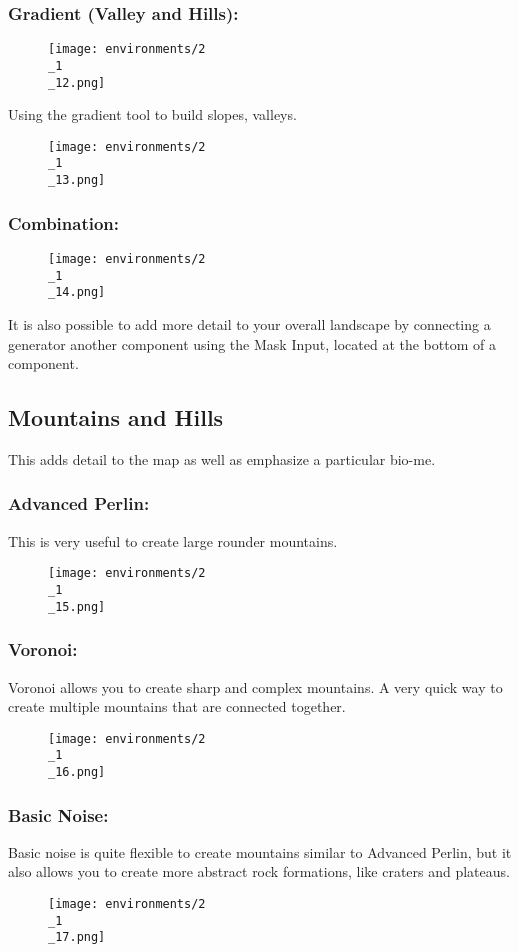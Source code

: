 \documentclass[../main.tex]{subfiles}
\begin{document}
\subsubsection{Gradient (Valley and Hills):}
\begin{figure}[H]
\texttt{[image: environments/2\\\_1\\\_12.png]}
\end{figure}
Using the gradient tool to build slopes, valleys.
\begin{figure}[H]
\texttt{[image: environments/2\\\_1\\\_13.png]}
\end{figure}
\subsubsection{Combination:}
\begin{figure}[H]
\texttt{[image: environments/2\\\_1\\\_14.png]}
\end{figure}
It is also possible to add more detail to your overall landscape by connecting a generator another component using the Mask Input, located at the bottom of a component.

\subsection{Mountains and Hills}
This adds detail to the map as well as emphasize a particular bio-me.
\subsubsection{Advanced Perlin:}
This is very useful to create large rounder mountains.
\begin{figure}[H]
\texttt{[image: environments/2\\\_1\\\_15.png]}
\end{figure}
\subsubsection{Voronoi:}
Voronoi allows you to create sharp and complex mountains. A very quick way to create multiple mountains that are connected together.
\begin{figure}[H]
\texttt{[image: environments/2\\\_1\\\_16.png]}
\end{figure}

\subsubsection{Basic Noise:}
Basic noise is quite flexible to create mountains similar to Advanced Perlin, but it also allows you to create more abstract rock formations, like craters and plateaus.
\begin{figure}[H]
\texttt{[image: environments/2\\\_1\\\_17.png]}
\end{figure}
\end{document}
